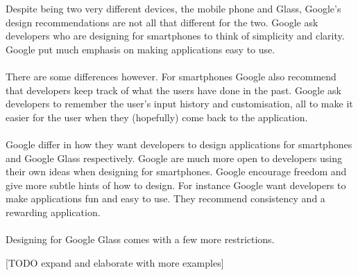 Despite being two very different devices, the mobile phone and Glass, Google's design recommendations are not all that different for the two. Google ask developers who are designing for smartphones to think of simplicity and clarity. Google put much emphasis on making applications easy to use.
\\
\\
There are some differences however. For smartphones Google also recommend that developers keep track of what the users have done in the past. Google ask developers to remember the user's input history and customisation, all to make it easier for the user when they (hopefully) come back to the application.\cite{androidDesignPrinciples}
\\
\\
Google differ in how they want developers to design applications for smartphones and Google Glass respectively. Google are much more open to developers using their own ideas when designing for smartphones. Google encourage freedom and give more subtle hints of how to design. For instance Google want developers to make applications fun and easy to use. They recommend consistency and a rewarding application.
\\
\\
Designing for Google Glass comes with a few more restrictions. 

[TODO expand and elaborate with more examples]